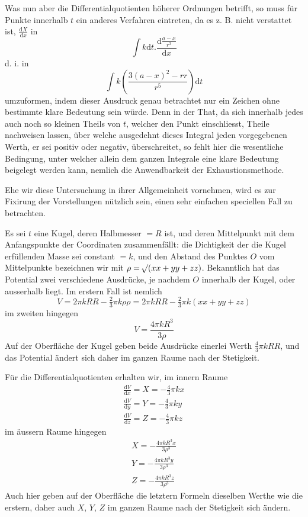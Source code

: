 Was nun aber die Differentialquotienten höherer Ordnungen betrifft, so muss für Punkte innerhalb $t$ ein anderes Verfahren eintreten, da es z. B. nicht verstattet ist, $\frac{\mathrm{d}X}{\mathrm{d}x}$ in
\[
\int k\mathrm{d}t.\frac{\mathrm{d}\frac{a-x}{r^3}}{\mathrm{d}x}
\]
d. i. in
\[
\int k(\frac{3(a-x)^2-rr}{r^5})\mathrm{d}t
\]
umzuformen, indem dieser Ausdruck genau betrachtet nur ein Zeichen ohne bestimmte klare Bedeutung sein würde. Denn in der That, da sich innerhalb jedes auch noch so kleinen Theils von $t$, welcher den Punkt einschliesst, Theile nachweisen lassen, über welche ausgedehnt dieses Integral jeden vorgegebenen Werth, er sei positiv oder negativ, überschreitet, so fehlt hier die wesentliche
Bedingung, unter welcher allein dem ganzen Integrale eine klare Bedeutung beigelegt werden kann, nemlich die Anwendbarkeit der Exhaustionsmethode.

Ehe wir diese Untersuchung in ihrer Allgemeinheit vornehmen, wird es zur Fixirung der Vorstellungen nützlich sein, einen sehr einfachen speciellen Fall zu betrachten.

Es sei $t$ eine Kugel, deren Halbmesser $=R$ ist, und deren Mittelpunkt mit dem Anfangspunkte der Coordinaten zusammenfällt: die Dichtigkeit der die Kugel erfüllenden Masse sei constant $=k$, und den Abstand des Punktes $O$ vom Mittelpunkte bezeichnen wir mit $\rho=\mathord{{}^{}\!\surd}(xx+yy+zz)$. Bekanntlich hat das Potential zwei verschiedene Ausdrücke, je nachdem $O$ innerhalb der Kugel, oder ausserhalb liegt. Im erstern Fall ist nemlich
\[
V=2\pi kRR-\tfrac{2}{3}\pi k\rho\rho=2\pi kRR-\tfrac{2}{3}\pi k(xx+yy+zz)
\]
im zweiten hingegen
\[
V=\frac{4\pi kR^3}{3\rho}
\]
Auf der Oberfläche der Kugel geben beide Ausdrücke einerlei Werth $\tfrac{4}{3}\pi kRR$, und das Potential ändert sich daher im ganzen Raume nach der Stetigkeit.

Für die Differentialquotienten erhalten wir, im innern Raume
\[
\begin{array}{l}
\displaystyle\frac{\mathrm{d}V}{\mathrm{d}x}=X=-\tfrac{4}{3}\pi kx\\[6pt]
\displaystyle\frac{\mathrm{d}V}{\mathrm{d}y}=Y=-\tfrac{4}{3}\pi ky\\[6pt]
\displaystyle\frac{\mathrm{d}V}{\mathrm{d}z}=Z=-\tfrac{4}{3}\pi kz
\end{array}
\]
im äussern Raume hingegen
\[
\begin{array}{l}
\displaystyle X=-\frac{4\pi kR^3x}{3\rho^3}\\[6pt]
\displaystyle Y=-\frac{4\pi kR^3y}{3\rho^3}\\[6pt]
\displaystyle Z=-\frac{4\pi kR^3z}{3\rho^3}
\end{array}
\]
Auch hier geben auf der Oberfläche die letztern Formeln dieselben Werthe wie die erstern, daher auch $X$, $Y$, $Z$ im ganzen Raume nach der Stetigkeit sich ändern.

